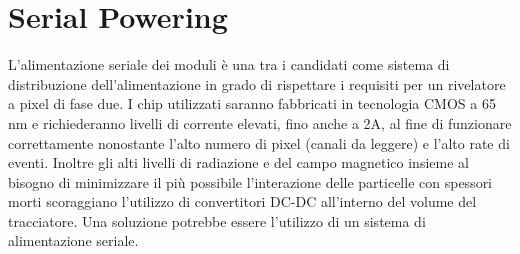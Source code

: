\chapter{Serial Powering}
L'alimentazione seriale dei moduli è una tra i candidati come sistema di distribuzione dell'alimentazione in grado di rispettare i requisiti per un rivelatore a pixel di fase due. 
I chip utilizzati saranno fabbricati in tecnologia CMOS a 65 nm e richiederanno livelli di corrente elevati, fino anche a 2A, al fine di funzionare correttamente nonostante l'alto numero di pixel (canali da leggere) e l'alto rate di eventi.
Inoltre gli alti livelli di radiazione e del campo magnetico insieme al bisogno di minimizzare il più possibile  l'interazione delle particelle con spessori morti scoraggiano l'utilizzo di convertitori DC-DC all'interno del volume del tracciatore. Una soluzione potrebbe essere l'utilizzo di un sistema di alimentazione seriale. 

